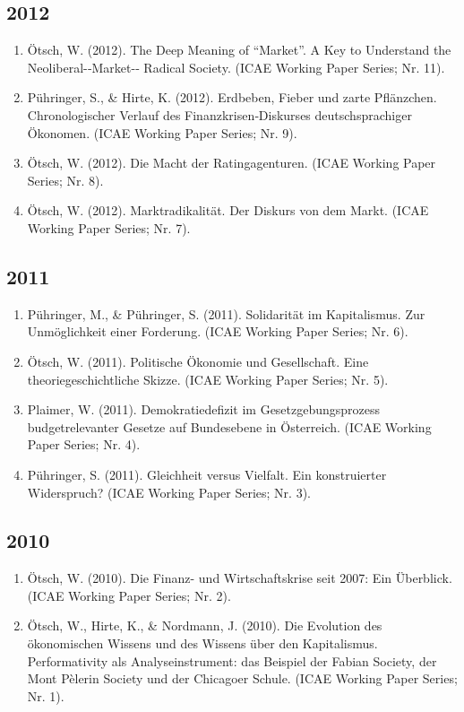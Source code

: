 \subsection*{2012}
\begin{enumerate}
	 \item Ötsch, W. (2012). The Deep Meaning of “Market”. A Key to Understand the Neoliberal-­‐Market-­‐ Radical Society. (ICAE Working Paper Series; Nr. 11).
	 \item Pühringer, S., \& Hirte, K. (2012). Erdbeben, Fieber und zarte Pflänzchen. Chronologischer Verlauf des Finanzkrisen‐Diskurses deutschsprachiger Ökonomen. (ICAE Working Paper Series; Nr. 9).
	 \item Ötsch, W. (2012). Die Macht der Ratingagenturen. (ICAE Working Paper Series; Nr. 8).
	 \item Ötsch, W. (2012). Marktradikalität. Der Diskurs von \glqq dem Markt\grqq{}. (ICAE Working Paper Series; Nr. 7).
\end{enumerate}
\subsection*{2011}
\begin{enumerate}
	 \item Pühringer, M., \& Pühringer, S. (2011). Solidarität im Kapitalismus. Zur Unmöglichkeit einer Forderung. (ICAE Working Paper Series; Nr. 6).
	 \item Ötsch, W. (2011). Politische Ökonomie und Gesellschaft. Eine theoriegeschichtliche Skizze. (ICAE Working Paper Series; Nr. 5).
	 \item Plaimer, W. (2011). Demokratiedefizit im Gesetzgebungsprozess budgetrelevanter Gesetze auf Bundesebene in Österreich. (ICAE Working Paper Series; Nr. 4).
	 \item Pühringer, S. (2011). Gleichheit versus Vielfalt. Ein konstruierter Widerspruch? (ICAE Working Paper Series; Nr. 3).
\end{enumerate}
\subsection*{2010}
\begin{enumerate}
	 \item Ötsch, W. (2010). Die Finanz-­ und Wirtschaftskrise seit 2007: Ein Überblick. (ICAE Working Paper Series; Nr. 2).
	 \item Ötsch, W., Hirte, K., \& Nordmann, J. (2010). Die Evolution des ökonomischen Wissens und des Wissens über den Kapitalismus. Performativity als Analyseinstrument: das Beispiel der Fabian Society, der Mont Pèlerin Society und der Chicagoer Schule. (ICAE Working Paper Series; Nr. 1).
\end{enumerate}
